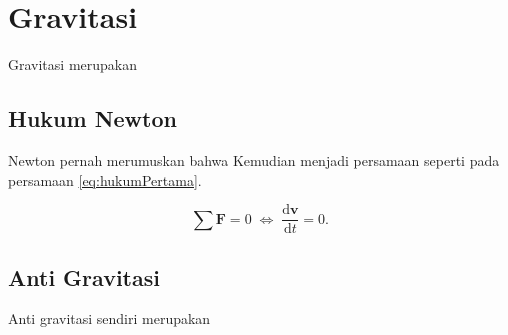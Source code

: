 \section{Gravitasi}
\vspace{1ex}

Gravitasi merupakan \lipsum[1]
\vspace{0.5ex}

\subsection{Hukum Newton}
\vspace{1ex}

Newton pernah merumuskan \citep{newtonLaw} bahwa \lipsum[2]
Kemudian menjadi persamaan seperti pada persamaan \ref{eq:hukumPertama}.
\vspace{0.5ex}

\begin{equation}\label{eq:hukumPertama}
  \sum \mathbf{F} = 0\; \Leftrightarrow\; \frac{\mathrm{d} \mathbf{v} }{\mathrm{d}t} = 0.
\end{equation}
\vspace{0.5ex}

\subsection{Anti Gravitasi}
\vspace{1ex}

Anti gravitasi sendiri merupakan \lipsum[3]
\vspace{0.5ex}